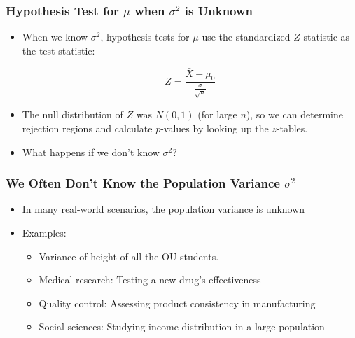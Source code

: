 \documentclass[14pt]{beamer}
\begin{document}
\begin{frame}
	\frametitle{Hypothesis Test for $\mu$ when $\sigma^2$ is Unknown}
	
	\begin{itemize}[label={\color{blue}$\blacktriangleright$}]
		\item When we know $\sigma^2$, hypothesis tests for $\mu$ use the standardized $Z$-statistic as the test statistic:
		
		\[
		Z = \frac{\bar{X} - \mu_0}{\frac{\sigma}{\sqrt{n}}}
		\]
		
		\item The null distribution of $Z$ was $N(0,1)$ (for large $n$), so we can determine rejection regions and calculate $p$-values by looking up the $z$-tables.
		
		\item What happens if we don't know $\sigma^2$?
	\end{itemize}
	
\end{frame}

\begin{frame}
	\frametitle{We Often Don't Know the Population Variance $\sigma^2$}
	\begin{itemize}[label={\color{blue}$\blacktriangleright$}]
		\item In many real-world scenarios, the population variance is unknown
		\item Examples:
		\begin{itemize}[label={\color{blue}$\blacktriangleright$}]
			\item Variance of height of all the OU students.
			\item Medical research: Testing a new drug's effectiveness
			\item Quality control: Assessing product consistency in manufacturing
			\item Social sciences: Studying income distribution in a large population
		\end{itemize}
	\end{itemize}
\end{frame}
\end{document}

